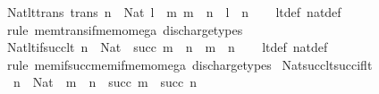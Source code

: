 \begin{isabellebody}
\ Nat{\isacharunderscore}{\kern0pt}lt{\isacharunderscore}{\kern0pt}trans\ {\isacharbrackleft}{\kern0pt}trans{\isacharbrackright}{\kern0pt}{\isacharcolon}{\kern0pt}\ {\isachardoublequoteopen}{\isasymlbrakk}n\ {\isacharcolon}{\kern0pt}\ Nat{\isacharsemicolon}{\kern0pt}\ l\ {\isacharless}{\kern0pt}\ m{\isacharsemicolon}{\kern0pt}\ m\ {\isacharless}{\kern0pt}\ n{\isasymrbrakk}\ {\isasymLongrightarrow}\ l\ {\isacharless}{\kern0pt}\ n{\isachardoublequoteclose}\isanewline
%
\isadelimproof
\ \ %
\endisadelimproof
%
\isatagproof
{}\isamarkupfalse%
\ lt{\isacharunderscore}{\kern0pt}def\ nat{\isacharunderscore}{\kern0pt}def\ \isamarkupfalse%
\ {\isacharparenleft}{\kern0pt}rule\ mem{\isacharunderscore}{\kern0pt}trans{\isacharunderscore}{\kern0pt}if{\isacharunderscore}{\kern0pt}mem{\isacharunderscore}{\kern0pt}omega{\isacharparenright}{\kern0pt}\ discharge{\isacharunderscore}{\kern0pt}types%
\endisatagproof
{\isafoldproof}%
%
\isadelimproof
\isanewline
%
\endisadelimproof
\isanewline
{}\isamarkupfalse%
\ Nat{\isacharunderscore}{\kern0pt}lt{\isacharunderscore}{\kern0pt}if{\isacharunderscore}{\kern0pt}succ{\isacharunderscore}{\kern0pt}lt{\isacharcolon}{\kern0pt}\ {\isachardoublequoteopen}n\ {\isacharcolon}{\kern0pt}\ Nat\ {\isasymLongrightarrow}\ succ\ m\ {\isacharless}{\kern0pt}\ n\ {\isasymLongrightarrow}\ m\ {\isacharless}{\kern0pt}\ n{\isachardoublequoteclose}\isanewline
%
\isadelimproof
\ \ %
\endisadelimproof
%
\isatagproof
{}\isamarkupfalse%
\ lt{\isacharunderscore}{\kern0pt}def\ nat{\isacharunderscore}{\kern0pt}def\isanewline
\ \ \isamarkupfalse%
\ {\isacharparenleft}{\kern0pt}rule\ mem{\isacharunderscore}{\kern0pt}if{\isacharunderscore}{\kern0pt}succ{\isacharunderscore}{\kern0pt}mem{\isacharunderscore}{\kern0pt}if{\isacharunderscore}{\kern0pt}mem{\isacharunderscore}{\kern0pt}omega{\isacharparenright}{\kern0pt}\ discharge{\isacharunderscore}{\kern0pt}types%
\endisatagproof
{\isafoldproof}%
%
\isadelimproof
\isanewline
%
\endisadelimproof
\isanewline
{}\isamarkupfalse%
\ Nat{\isacharunderscore}{\kern0pt}succ{\isacharunderscore}{\kern0pt}lt{\isacharunderscore}{\kern0pt}succ{\isacharunderscore}{\kern0pt}if{\isacharunderscore}{\kern0pt}lt{\isacharcolon}{\kern0pt}\isanewline
\ \ {\isachardoublequoteopen}n\ {\isacharcolon}{\kern0pt}\ Nat\ {\isasymLongrightarrow}\ m\ {\isacharless}{\kern0pt}\ n\ {\isasymLongrightarrow}\ succ\ m\ {\isacharless}{\kern0pt}\ succ\ n{\isachardoublequoteclose}\isanewline
%
\isadelimproof
\ \ %
\endisadelimproof
%
\isatagproof
{}\isamarkupfalse%

\end{isabellebody}
